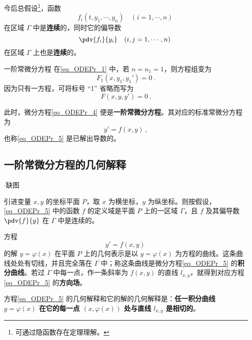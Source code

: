 今后总假设\footnote{可通过隐函数存在定理理解。}，函数 
\begin{equation}
f_i(t,y_1,\cdots,y_n)\quad (i=1,\cdots,n)~
\end{equation}
在区域 $\Gamma$ 中是\textbf{连续}的，同时它的偏导数
\begin{equation}
\pdv{f_i}{y_i}\quad (i,j=1,\cdots,n)~
\end{equation}
在区域 $\Gamma$ 上也是\textbf{连续}的。
\begin{example}{一阶常微分方程}
在\autoref{eq_ODEPr_1} 中，若 $n=n_1=1$，则方程组变为
\begin{equation}\label{eq_ODEPr_3}
F_1(x,y_1,y_1')=0~.
\end{equation}
因为只有一方程，可将标号 “1” 省略而写为
\begin{equation}\label{eq_ODEPr_4}
F(x,y,y')=0~.
\end{equation}

此时，微分方程\autoref{eq_ODEPr_4} 便是\textbf{一阶常微分方程}。其对应的标准常微分方程为
\begin{equation}\label{eq_ODEPr_5}
y'=f(x,y)~,
\end{equation}
也称\autoref{eq_ODEPr_5} 是已解出导数的。
\end{example}
\subsection{一阶常微分方程的几何解释}
\begin{issues}
$\cdot$缺图
\end{issues}

引进变量 $x,y$ 的坐标平面 $P$，取 $x$ 为横坐标，$y$ 为纵坐标。则按假设，\autoref{eq_ODEPr_5} 中的函数 $f$ 的定义域是平面 $P$ 上的一区域 $\Gamma$，且 $f$ 及其偏导数 $\pdv{f}{y}$ 在 $\Gamma$ 中是连续的。

方程
\begin{equation}
y'=f(x,y)~
\end{equation}
的解 $y=\varphi(x)$ 在平面 $P$ 上的几何表示是以 $y=\varphi(x)$ 为方程的曲线。这条曲线处处有切线，并且完全落在 $\Gamma$ 中；称这条曲线是微分方程\autoref{eq_ODEPr_5} 的\textbf{积分曲线}。若过 $\Gamma$ 中每一点，作一条斜率为 $f(x,y)$ 的直线 $l_{x,y}$，就得到对应方程\autoref{eq_ODEPr_5} 的\textbf{方向场}。

方程\autoref{eq_ODEPr_5} 的几何解释和它的解的几何解释是：\textbf{任一积分曲线 $y=\varphi(x)$ 在它的每一点 $(x,\varphi(x))$ 处与直线 $l_{x,y}$ 是相切的}。
